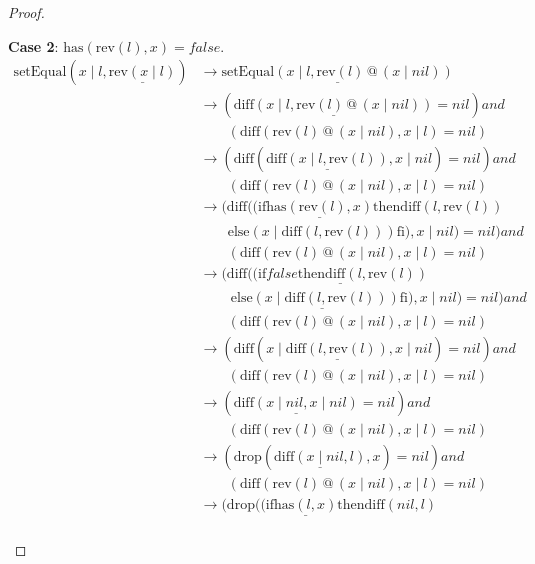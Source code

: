 \documentclass[12pt, a4paper]{article}
\newcommand{\rel}[1]{\mathrel{#1}}
\newcommand{\rmx}[1]{\mathrm{#1}}
\newcommand{\larrow}{\longrightarrow}
\newcommand{\under}{\underline}
\begin{document}
\begin{proof}
\begin{description}
\textbf{Case 2}: $\rmx{has}(\rmx{rev}(l), x) = false$.
\begin{align*}
\rmx{setEqual}(x \mid l, \under{\rmx{rev}(x \mid l)})
	&\larrow \under{\rmx{setEqual}(x \mid l, \rmx{rev}(l) \rel{@} (x \mid nil))} \tag{by rev2} \\
	&\larrow (\under{\rmx{diff}(x \mid l, \rmx{rev}(l) \rel{@} (x \mid nil))} = nil) \rel{and} \\
	&\quad \quad (\rmx{diff}(\rmx{rev}(l) \rel{@} (x \mid nil), x \mid l) = nil) \tag{by setEq} \\
	&\larrow (\rmx{diff}(\under{\rmx{diff}(x \mid l, \rmx{rev}(l))}, x \mid nil) = nil) \rel{and} \\
	&\quad \quad (\rmx{diff}(\rmx{rev}(l) \rel{@} (x \mid nil), x \mid l) = nil) \tag{by Problem 7 - Lemma 1} \\
	&\larrow (\rmx{diff}((\rel{\rmx{if}} \under{\rmx{has}(\rmx{rev}(l), x)} \rel{\rmx{then}} \rmx{diff}(l, \rmx{rev}(l)) \\
	&\quad \quad \rel{\rmx{else}} (x \mid \rmx{diff}(l, \rmx{rev}(l))) \rel{\rmx{fi}}), x \mid nil) = nil) \rel{and} \\
	&\quad \quad (\rmx{diff}(\rmx{rev}(l) \rel{@} (x \mid nil), x \mid l) = nil) \tag{by diff2} \\
	 &\larrow (\rmx{diff}(\under{(\rel{\rmx{if}} false \rel{\rmx{then}} \rmx{diff}(l, \rmx{rev}(l))} \\
	&\quad \quad\ \under{\rel{\rmx{else}} (x \mid \rmx{diff}(l, \rmx{rev}(l))) \rel{\rmx{fi}})}, x \mid nil) = nil) \rel{and} \\
	&\quad \quad (\rmx{diff}(\rmx{rev}(l) \rel{@} (x \mid nil), x \mid l) = nil) \tag{by case splitting} \\
	 &\larrow (\rmx{diff}(x \mid \under{\rmx{diff}(l, \rmx{rev}(l))}, x \mid nil) = nil) \rel{and} \\
	&\quad \quad (\rmx{diff}(\rmx{rev}(l) \rel{@} (x \mid nil), x \mid l) = nil) \tag{by if2} \\
	&\larrow (\under{\rmx{diff}(x \mid nil, x \mid nil)} = nil) \rel{and} \\
	&\quad \quad (\rmx{diff}(\rmx{rev}(l) \rel{@} (x \mid nil), x \mid l) = nil) \tag{by Problem 7} \\
	 &\larrow (\rmx{drop}(\under{\rmx{diff}(x \mid nil, l)}, x) = nil) \rel{and} \\
	&\quad \quad (\rmx{diff}(\rmx{rev}(l) \rel{@} (x \mid nil), x \mid l) = nil) \tag{by Problem 14} \\
	 &\larrow (\rmx{drop}((\rel{\rmx{if}} \under{\rmx{has}(l, x)} \rel{\rmx{then}} \rmx{diff}(nil, l) \\

\end{align*}
\end{description}
\end{proof}
\end{document}
